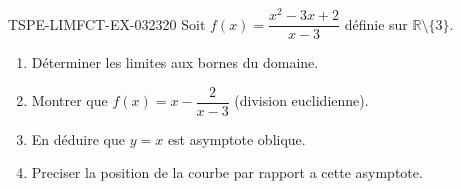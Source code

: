 \begin{exercice}{TSPE-LIMFCT-EX-032}{3}{20}
Soit $f(x) = \dfrac{x^2 - 3x + 2}{x - 3}$ définie sur $\mathbb{R} \setminus \{3\}$.
\begin{enumerate}
  \item Déterminer les limites aux bornes du domaine.
  \item Montrer que $f(x) = x - \dfrac{2}{x-3}$ (division euclidienne).
  \item En déduire que $y = x$ est asymptote oblique.
  \item Preciser la position de la courbe par rapport a cette asymptote.
\end{enumerate}
\end{exercice}
